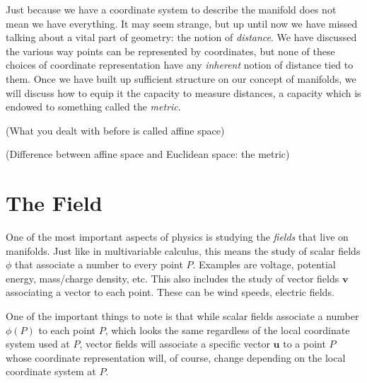	Just because we have a coordinate system to describe the manifold does not mean we have everything. It may seem strange, but up until now we have missed talking about a vital part of geometry: the notion of \emph{distance}. We have discussed the various way points can be represented by coordinates, but none of these choices of coordinate representation have any \emph{inherent} notion of distance tied to them.  Once we have built up sufficient structure on our concept of manifolds, we will discuss how to equip it the capacity to measure distances, a capacity which is endowed to something called the \textit{metric}. 
	
	(What you dealt with before is called affine space)
	
	(Difference between affine space and Euclidean space: the metric)
	
	
	
	\section{The Field} %
	\label{sec:the_field}
	
	One of the most important aspects of physics is studying the \emph{fields} that live on manifolds. Just like in multivariable calculus, this means the study of scalar fields $\phi$ that associate a number to every point $P$. Examples are voltage, potential energy, mass/charge density, etc. This also includes the study of vector fields $\mathbf v$ associating a vector to each point. These can be wind speeds, electric fields. 
	
	One of the important things to note is that while scalar fields associate a number $\phi(P)$ to each point $P$, which looks the same regardless of the local coordinate system used at $P$, vector fields will associate a specific vector $\mathbf u$ to a point $P$ whose coordinate representation will, of course, change depending on the local coordinate system at $P$. 